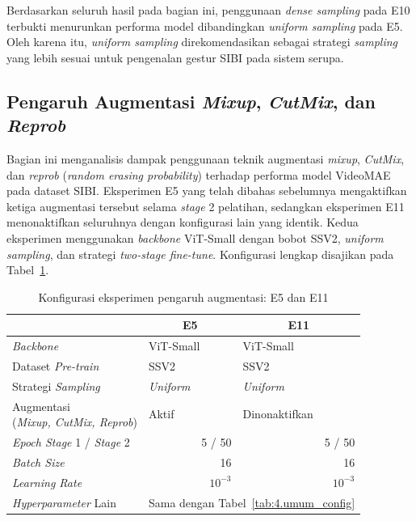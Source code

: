 Berdasarkan seluruh hasil pada bagian ini, penggunaan \textit{dense sampling} pada E10 terbukti menurunkan performa model dibandingkan \textit{uniform sampling} pada E5. Oleh karena itu, \textit{uniform sampling} direkomendasikan sebagai strategi \textit{sampling} yang lebih sesuai untuk pengenalan gestur SIBI pada sistem serupa.\par

\subsection{Pengaruh Augmentasi \textit{Mixup}, \textit{CutMix}, dan \textit{Reprob}} \label{IV.Sek5}

Bagian ini menganalisis dampak penggunaan teknik augmentasi \textit{mixup}, \textit{CutMix}, dan \textit{reprob} (\textit{random erasing probability}) terhadap performa model VideoMAE pada dataset SIBI. Eksperimen E5 yang telah dibahas sebelumnya mengaktifkan ketiga augmentasi tersebut selama \textit{stage} 2 pelatihan, sedangkan eksperimen E11 menonaktifkan seluruhnya dengan konfigurasi lain yang identik. Kedua eksperimen menggunakan \textit{backbone} ViT-Small dengan bobot SSV2, \textit{uniform sampling}, dan strategi \textit{two-stage fine-tune}. Konfigurasi lengkap disajikan pada Tabel~\ref{tab:4.s5aug_config}.\par

\begin{table}[H]
\centering
\caption{Konfigurasi eksperimen pengaruh augmentasi: E5 dan E11}
\label{tab:4.s5aug_config}
{\setlength{\tabcolsep}{3pt}
\footnotesize
\begin{tabular}{|l|l|l|}
\hline
\rowcolor{gray!15} \multicolumn{1}{|c|}{\textbf{Parameter}} & \multicolumn{1}{c|}{\textbf{E5}} & \multicolumn{1}{c|}{\textbf{E11}} \\
\hline
\textit{Backbone} & ViT-Small & ViT-Small \\
\hline
Dataset \textit{Pre-train} & SSV2 & SSV2 \\
\hline
Strategi \textit{Sampling} & \textit{Uniform} & \textit{Uniform} \\
\hline
\makecell[l]{Augmentasi\\(\textit{Mixup, CutMix, Reprob})} & Aktif & Dinonaktifkan \\
\hline
\textit{Epoch Stage} 1 / \textit{Stage} 2 & \multicolumn{1}{r|}{5 / 50} & \multicolumn{1}{r|}{5 / 50} \\
\hline
\textit{Batch Size} & \multicolumn{1}{r|}{16} & \multicolumn{1}{r|}{16} \\
\hline
\textit{Learning Rate} & \multicolumn{1}{r|}{$10^{-3}$} & \multicolumn{1}{r|}{$10^{-3}$} \\
\hline
\textit{Hyperparameter} Lain & \multicolumn{2}{l|}{Sama dengan Tabel~\ref{tab:4.umum_config}} \\
\hline
\end{tabular}
}
\end{table}

